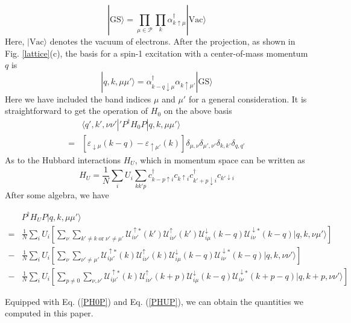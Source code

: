\documentclass[amsmath,superscriptaddress,showpacs,aps,prb,twocolumn]{revtex4-1}
\begin{document}
\begin{equation}\label{GS}
|\text{GS}\rangle=\prod_{\mu\in\mathcal{P}}\prod_{k}\alpha^\dagger_{k\uparrow\mu}|\text{Vac}\rangle
\end{equation}
Here, $|\text{Vac}\rangle$ denotes the vacuum of electrons. After the projection, as shown in Fig. \ref{lattice}(c), the basis for a spin-1 excitation with a center-of-mass momentum $q$ is
\begin{equation}\label{basis}
  |q,k,\mu\mu'\rangle=\alpha^\dagger_{k-q\downarrow\mu}\alpha_{k\uparrow\mu'}|\text{GS}\rangle
\end{equation}
Here we have included the band indices $\mu$ and $\mu'$ for a general consideration.
It is straightforward to get the operation of $H_0$ on the above basis
\begin{equation}\label{PH0P}
\begin{aligned}
  &\langle q',k',\nu\nu'|'P^\dagger H_0P|q,k,\mu\mu'\rangle \\
  =& \left[\varepsilon_{\downarrow\mu}(k-q)-\varepsilon_{\uparrow\mu'}(k)\right]\delta_{\mu,\nu}\delta_{\mu',\nu'}\delta_{k,k'}\delta_{q,q'}
\end{aligned}
\end{equation}
As to the Hubbard interactions $H_U$, which in momentum space can be written as
\begin{equation}\label{Hubbard}
  H_U=\frac{1}{N}\sum_{i}U_i\sum_{kk'p}c^\dagger_{k-p\uparrow i}c_{k\uparrow i}c^\dagger_{k'+p\downarrow i}c_{k'\downarrow i}
\end{equation}
After some algebra, we have
\begin{widetext}
\begin{equation}\label{PHUP}
\begin{aligned}
  &P^\dagger H_U P|q,k,\mu\mu'\rangle    \\
    =&\frac{1}{N}\sum_iU_i\left[
        \sum_\nu\sum_{k'\neq k\;\text{or}\;\nu'\neq\mu'}\mathcal{U}^{\uparrow*}_{i\nu'}(k')\mathcal{U}^\uparrow_{i\nu'}(k')
        \mathcal{U}^\downarrow_{i\mu}(k-q)\mathcal{U}^{\downarrow*}_{i\nu}(k-q)|q,k,\nu\mu'\rangle
    \right]     \\
    -&\frac{1}{N}\sum_iU_i\left[
        \sum_\nu\sum_{\nu'\neq\mu'}\mathcal{U}^{\uparrow*}_{i\mu'}(k)\mathcal{U}^\uparrow_{i\nu'}(k)
        \mathcal{U}^\downarrow_{i\mu}(k-q)\mathcal{U}^{\downarrow*}_{i\nu}(k-q)|q,k,\nu\nu'\rangle
    \right]     \\
    -&\frac{1}{N}\sum_iU_i\left[
        \sum_{p\neq0}\sum_{\nu,\nu'}\mathcal{U}^{\uparrow*}_{i\mu'}(k)\mathcal{U}^\uparrow_{i\nu'}(k+p)
        \mathcal{U}^\downarrow_{i\mu}(k-q)\mathcal{U}^{\downarrow*}_{i\nu}(k+p-q)|q,k+p,\nu\nu'\rangle
    \right]
\end{aligned}
\end{equation}
\end{widetext}
Equipped with Eq. (\ref{PH0P}) and Eq. (\ref{PHUP}), we can obtain the quantities we computed in this paper.
\end{document}

